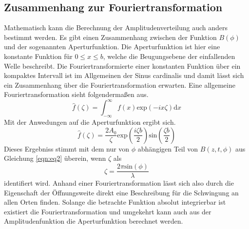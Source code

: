 \subsection{Zusammenhang zur Fouriertransformation}
Mathematisch kann die Berechnung der Amplitudenverteilung auch anders bestimmt werden. Es gibt einen Zusammenhang zwischen der Funktion $B(\phi)$ und der sogenannten Aperturfunktion. Die Aperturfunktion ist hier eine konstante Funktion 
für $ 0 \leq x \leq b$, welche die Beugungsebene der einfallenden Welle beschreibt.
Die Fouriertransformierte einer konstanten Funktion über ein kompaktes Intervall ist im Allgemeinen der Sinus cardinalis und damit lässt sich ein Zusammenhang über die Fouriertransformation erwarten.
Eine allgemeine Fouriertransformation sieht folgendermaßen aus.
\begin{equation}
\hat{f}(\zeta) = \int_{-\infty}^{\infty} f(x) \text{exp}(-ix\zeta) \text{d}x
\end{equation}
Mit der Anwedungen auf die Aperturfunktion ergibt sich.
\begin{equation}
    \hat{f}(\zeta) = \frac{2A_{0}}{\zeta} \text{exp}\left(\frac{i \zeta b}{2}\right) \text{sin}\left(\frac{\zeta b}{2}\right)
\end{equation}
Dieses Ergebniss stimmt mit dem nur von $\phi$ abhängigen Teil von $B(z, t, \phi)$ aus Gleichung \eqref{eqn:eq2} überein, wenn $\zeta$ als
\begin{equation}
\zeta = \frac{2\pi \text{sin}(\phi)}{\lambda}
\end{equation}
identifiert wird. Anhand einer Fouriertransformation lässt sich also durch die Eigenschaft der Öffnungsweite direkt eine Beschreibung für die Schwingung an allen Orten finden. Solange die betrachte Funktion absolut integrierbar ist existiert die Fouriertransformation und umgekehrt
kann auch aus der Amplitudenfunktion die Aperturfunktion berechnet werden. 